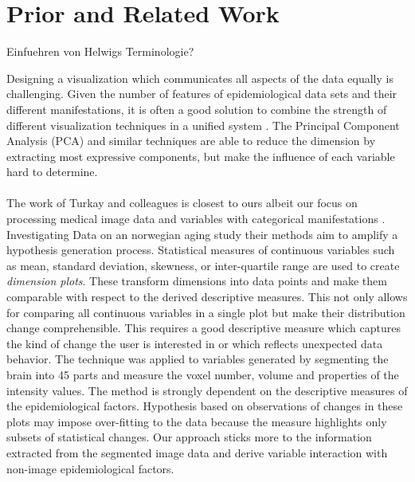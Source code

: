 \documentclass[journal]{style/vgtc} 			          %
\begin{document}
\section{Prior and Related Work}
Einfuehren von Helwigs Terminologie?

Designing a visualization which communicates all aspects of the data equally is challenging.
%
Given the number of features of epidemiological data sets and their different manifestations, it is often a good solution to combine the strength of different visualization techniques in a unified system \cite{Buja91, Konyha2009}.
%
The Principal Component Analysis (PCA) and similar techniques are able to reduce the dimension by extracting most expressive components, but make the influence of each variable hard to determine.
\\\\
The work of Turkay and colleagues is closest to ours albeit our focus on processing medical image data and variables with categorical manifestations \cite{Turkay2013}.
%
Investigating Data on an norwegian aging study their methods aim to amplify a hypothesis generation process.
%
Statistical measures of continuous variables such as mean, standard deviation, skewness, or inter-quartile range are used to create \emph{dimension plots}.
%
These transform dimensions into data points and make them comparable with respect to the derived descriptive measures.
%
This not only allows for comparing all continuous variables in a single plot but make their distribution change comprehensible.
%
This requires a good descriptive measure which captures the kind of change the user is interested in or which reflects unexpected data behavior.
%
The technique was applied to variables generated by segmenting the brain into 45 parts and measure the voxel number, volume and properties of the intensity values.
%
The method is strongly dependent on the descriptive measures of the epidemiological factors.
%
Hypothesis based on observations of changes in these plots may impose over-fitting to the data because the measure highlights only subsets of statistical changes.
%
Our approach sticks more to the information extracted from the segmented image data and derive variable interaction with non-image epidemiological factors.
\end{document}
